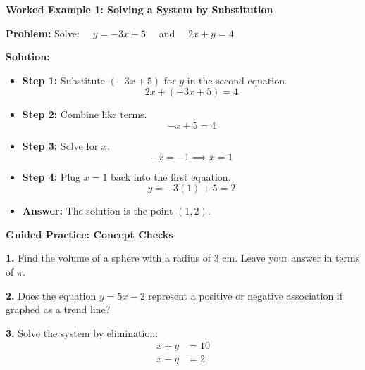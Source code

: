 \documentclass[12pt, letterpaper, fleqn]{article}
\begin{document}
\vspace{3mm}

\begin{tcolorbox}[colback=white, colframe=black!25, boxrule=0.6pt, arc=4mm, left=6mm, right=6mm, top=5mm, bottom=5mm]

\textbf{Worked Example 1: Solving a System by Substitution}

\medskip

\textbf{Problem:} Solve: \ \ $y = -3x + 5$ \ \ and \ \ $2x + y = 4$

\medskip

\textbf{Solution:}
\begin{itemize}
    \item \textbf{Step 1:} Substitute $(-3x + 5)$ for $y$ in the second equation.
    \[ 2x + (-3x + 5) = 4 \]
    \item \textbf{Step 2:} Combine like terms.
    \[ -x + 5 = 4 \]
    \item \textbf{Step 3:} Solve for $x$.
    \[ -x = -1 \implies x = 1 \]
    \item \textbf{Step 4:} Plug $x=1$ back into the first equation.
    \[ y = -3(1) + 5 = 2 \]
    \item \textbf{Answer:} The solution is the point $(1, 2)$.
\end{itemize}

\end{tcolorbox}

\vspace{4mm}

\begin{tcolorbox}[colback=white!15, colframe=black, boxrule=1.5pt, arc=4mm, left=6mm, right=6mm, top=5mm, bottom=5mm]

\textbf{Guided Practice: Concept Checks}

\medskip

\noindent
\textbf{1.} Find the volume of a sphere with a radius of $3\text{ cm}$. Leave your answer in terms of $\pi$.
\vspace{2cm}

\noindent
\textbf{2.} Does the equation $y = 5x - 2$ represent a positive or negative association if graphed as a trend line?
\vspace{1cm}

\noindent
\textbf{3.} Solve the system by elimination:
\begin{align*}
    x + y &= 10 \\
    x - y &= 2
\end{align*}
\vspace{2cm}

\end{tcolorbox}
\end{document}
